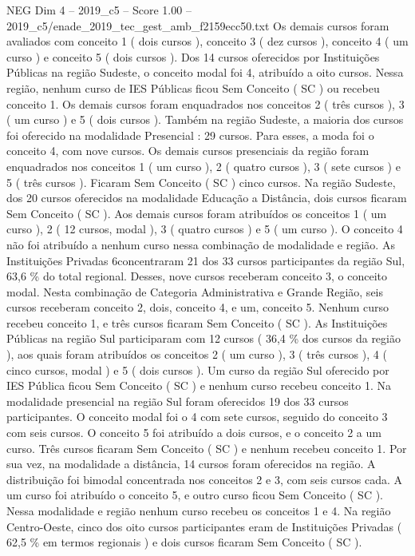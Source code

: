 \begin{textsample}{NEG Dim 4 – 2019\_c5 – Score 1.00 – 2019\_c5/enade\_2019\_tec\_gest\_amb\_f2159ecc50.txt}
Os demais cursos foram avaliados com conceito 1 ( dois cursos ), conceito 3 ( dez cursos ), conceito 4 ( um curso ) e conceito 5 ( dois cursos ).
Dos 14 cursos oferecidos por Instituições Públicas na região Sudeste, o conceito modal foi 4, atribuído a oito cursos.
Nessa região, nenhum curso de IES Públicas ficou Sem Conceito ( SC ) ou recebeu conceito 1.
Os demais cursos foram enquadrados nos conceitos 2 ( três cursos ), 3 ( um curso ) e 5 ( dois cursos ).
Também na região Sudeste, a maioria dos cursos foi oferecido na modalidade Presencial : 29 cursos.
Para esses, a moda foi o conceito 4, com nove cursos.
Os demais cursos presenciais da região foram enquadrados nos conceitos 1 ( um curso ), 2 ( quatro cursos ), 3 ( sete cursos ) e 5 ( três cursos ).
Ficaram Sem Conceito ( SC ) cinco cursos.
Na região Sudeste, dos 20 cursos oferecidos na modalidade Educação a Distância, dois cursos ficaram Sem Conceito ( SC ).
Aos demais cursos foram atribuídos os conceitos 1 ( um curso ), 2 ( 12 cursos, modal ), 3 ( quatro cursos ) e 5 ( um curso ).
O conceito 4 não foi atribuído a nenhum curso nessa combinação de modalidade e região.
As Instituições Privadas 6concentraram 21 dos 33 cursos participantes da região Sul, 63,6 \% do total regional.
Desses, nove cursos receberam conceito 3, o conceito modal.
Nesta combinação de Categoria Administrativa e Grande Região, seis cursos receberam conceito 2, dois, conceito 4, e um, conceito 5.
Nenhum curso recebeu conceito 1, e três cursos ficaram Sem Conceito ( SC ).
As Instituições Públicas na região Sul participaram com 12 cursos ( 36,4 \% dos cursos da região ), aos quais foram atribuídos os conceitos 2 ( um curso ), 3 ( três cursos ), 4 ( cinco cursos, modal ) e 5 ( dois cursos ).
Um curso da região Sul oferecido por IES Pública ficou Sem Conceito ( SC ) e nenhum curso recebeu conceito 1.
Na modalidade presencial na região Sul foram oferecidos 19 dos 33 cursos participantes.
O conceito modal foi o 4 com sete cursos, seguido do conceito 3 com seis cursos.
O conceito 5 foi atribuído a dois cursos, e o conceito 2 a um curso.
Três cursos ficaram Sem Conceito ( SC ) e nenhum recebeu conceito 1.
Por sua vez, na modalidade a distância, 14 cursos foram oferecidos na região.
A distribuição foi bimodal concentrada nos conceitos 2 e 3, com seis cursos cada.
A um curso foi atribuído o conceito 5, e outro curso ficou Sem Conceito ( SC ).
Nessa modalidade e região nenhum curso recebeu os conceitos 1 e 4.
Na região Centro-Oeste, cinco dos oito cursos participantes eram de Instituições Privadas ( 62,5 \% em termos regionais ) e dois cursos ficaram Sem Conceito ( SC ).

\end{textsample}
